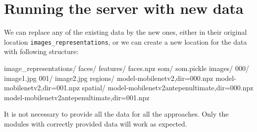 \section{Running the server with new data}
\label{s:dir_structure}

We can replace any of the existing data by the new ones, either in their original location \verb+images_representations+, or we can create a new location for the data with following structure:


\vspace{0.5cm}
\begin{boxedverbatim}
image_representations/
    faces/
        features/
            faces.npz
        som/
            som.pickle
    images/
        000/
            image1.jpg
        001/
            image2.jpg
    regions/
        model-mobilenetv2,dir=000.npz
        model-mobilenetv2,dir=001.npz
    spatial/
        model-mobilenetv2antepenultimate,dir=000.npz
        model-mobilenetv2antepenultimate,dir=001.npz
\end{boxedverbatim}
\vspace{0.5cm}

It is not necessary to provide all the data for all the approaches. Only the modules with correctly provided data will work as expected.
